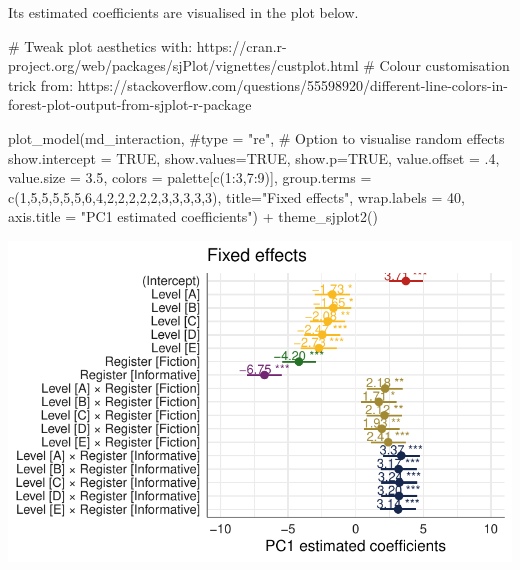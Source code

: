 \documentclass[
  letterpaper,
  DIV=11,
  numbers=noendperiod]{scrreprt}
\newenvironment{Shaded}{\begin{snugshade}}{\end{snugshade}}
\newcommand{\AttributeTok}[1]{\textcolor[rgb]{0.40,0.45,0.13}{#1}}
\newcommand{\CommentTok}[1]{\textcolor[rgb]{0.37,0.37,0.37}{#1}}
\newcommand{\ConstantTok}[1]{\textcolor[rgb]{0.56,0.35,0.01}{#1}}
\newcommand{\DecValTok}[1]{\textcolor[rgb]{0.68,0.00,0.00}{#1}}
\newcommand{\FloatTok}[1]{\textcolor[rgb]{0.68,0.00,0.00}{#1}}
\newcommand{\FunctionTok}[1]{\textcolor[rgb]{0.28,0.35,0.67}{#1}}
\newcommand{\NormalTok}[1]{\textcolor[rgb]{0.00,0.23,0.31}{#1}}
\newcommand{\SpecialCharTok}[1]{\textcolor[rgb]{0.37,0.37,0.37}{#1}}
\newcommand{\StringTok}[1]{\textcolor[rgb]{0.13,0.47,0.30}{#1}}
\begin{document}
Its estimated coefficients are visualised in the plot below.

\begin{Shaded}
\begin{Highlighting}[]
\CommentTok{\# Tweak plot aesthetics with: https://cran.r{-}project.org/web/packages/sjPlot/vignettes/custplot.html}
\CommentTok{\# Colour customisation trick from: https://stackoverflow.com/questions/55598920/different{-}line{-}colors{-}in{-}forest{-}plot{-}output{-}from{-}sjplot{-}r{-}package}

\FunctionTok{plot\_model}\NormalTok{(md\_interaction, }
           \CommentTok{\#type = "re", \# Option to visualise random effects }
           \AttributeTok{show.intercept =} \ConstantTok{TRUE}\NormalTok{,}
           \AttributeTok{show.values=}\ConstantTok{TRUE}\NormalTok{, }
           \AttributeTok{show.p=}\ConstantTok{TRUE}\NormalTok{,}
           \AttributeTok{value.offset =}\NormalTok{ .}\DecValTok{4}\NormalTok{,}
           \AttributeTok{value.size =} \FloatTok{3.5}\NormalTok{,}
           \AttributeTok{colors =}\NormalTok{ palette[}\FunctionTok{c}\NormalTok{(}\DecValTok{1}\SpecialCharTok{:}\DecValTok{3}\NormalTok{,}\DecValTok{7}\SpecialCharTok{:}\DecValTok{9}\NormalTok{)],}
           \AttributeTok{group.terms =} \FunctionTok{c}\NormalTok{(}\DecValTok{1}\NormalTok{,}\DecValTok{5}\NormalTok{,}\DecValTok{5}\NormalTok{,}\DecValTok{5}\NormalTok{,}\DecValTok{5}\NormalTok{,}\DecValTok{5}\NormalTok{,}\DecValTok{6}\NormalTok{,}\DecValTok{4}\NormalTok{,}\DecValTok{2}\NormalTok{,}\DecValTok{2}\NormalTok{,}\DecValTok{2}\NormalTok{,}\DecValTok{2}\NormalTok{,}\DecValTok{2}\NormalTok{,}\DecValTok{3}\NormalTok{,}\DecValTok{3}\NormalTok{,}\DecValTok{3}\NormalTok{,}\DecValTok{3}\NormalTok{,}\DecValTok{3}\NormalTok{), }
           \AttributeTok{title=}\StringTok{"Fixed effects"}\NormalTok{,}
           \AttributeTok{wrap.labels =} \DecValTok{40}\NormalTok{,}
           \AttributeTok{axis.title =} \StringTok{"PC1 estimated coefficients"}\NormalTok{) }\SpecialCharTok{+}
  \FunctionTok{theme\_sjplot2}\NormalTok{() }
\end{Highlighting}
\end{Shaded}

\includegraphics{G_Ch7_Analysis_files/figure-pdf/Dim1fixed-1.pdf}
\end{document}
